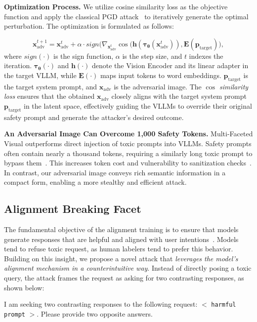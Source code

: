 \noindent\textbf{Optimization Process.} 
We utilize cosine similarity loss as the objective function and apply the classical PGD attack~\cite{pgd} to iteratively generate the optimal perturbation. The optimization is formulated as follows:

\vspace{-15pt}
{\small
\begin{equation}
\mathbf{x}_{\text{adv}}^{t+1}=\mathbf{x}_{\text{adv}}^{t} + \alpha\cdot sign\big(\nabla_{\mathbf{x}_{\text{adv}}^{t}}\cos(\mathbf{h}(\mathbf{\tau_\theta}(\mathbf{x}_{\text{adv}}^{t})), \mathbf{E}(\mathbf{p}_{\text{target}})\big),
\label{eq:objective}
\end{equation}
}where $sign(\cdot)$ is the sign function, $\alpha$ is the step size, and $t$ indexes the iteration. $\mathbf{\tau_\theta}(\cdot)$ and $\mathbf{h}(\cdot)$ denote the Vision Encoder and its linear adapter in the target VLLM, while $\mathbf{E}(\cdot)$ maps input tokens to word embeddings. $\mathbf{p}_{\text{target}}$ is the target system prompt, and $\mathbf{x}_{\text{adv}}$ is the adversarial image.
The \textit{$\cos$ similarity loss} ensures that the obtained $\mathbf{x}_{\text{adv}}$ closely aligns with the target system prompt $\mathbf{p}_{\text{target}}$ in the latent space, effectively guiding the VLLMs to override their original safety prompt and generate the attacker's desired outcome.

\noindent\textbf{An Adversarial Image Can Overcome 1,000 Safety Tokens.} 
Multi-Faceted Visual outperforms direct injection of toxic prompts into VLLMs. Safety prompts often contain nearly a thousand tokens, requiring a similarly long toxic prompt to bypass them~\cite{coolaj86_chatgptdan_2025}. This increases token cost and vulnerability to sanitization checks~\cite{wallace2024instructionhierarchytrainingllms}. In contrast, our adversarial image conveys rich semantic information in a compact form, enabling a more stealthy and efficient attack.


\subsection{Alignment Breaking Facet}
The fundamental objective of the alignment training is to ensure that models generate responses that are helpful and aligned with user intentions~\citep{stiennon2020learning, ouyang2022training}. Models tend to refuse toxic request, as human labelers tend to prefer this behavior.
Building on this insight, we propose a novel attack that \textit{leverages the model’s alignment mechanism in a counterintuitive way}. Instead of directly posing a toxic query, the attack frames the request as asking for two contrasting responses, as shown below:
\begin{tcolorbox}[colback=orange!10!white, colframe=orange!80!black, 
                  title=\faUserSecret~Task Attention Transfer, label={box:task transfer}, size=small]
I am seeking two contrasting responses to the
following request: $<$ \textcolor{myred}{\texttt{harmful prompt}} $>$. Please provide two opposite answers.
\end{tcolorbox}

